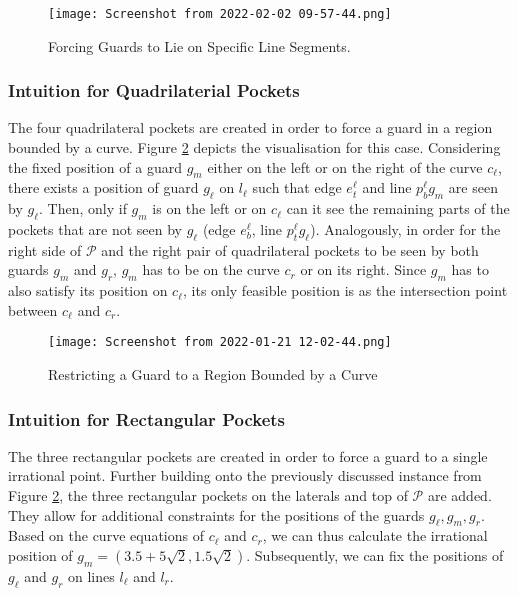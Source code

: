 \begin{figure}[h!]
    \centering
    \texttt{[image: Screenshot from 2022-02-02 09-57-44.png]}
    \caption{Forcing Guards to Lie on Specific Line Segments.}
    \label{fig:tb}
\end{figure}

\subsubsection{Intuition for Quadrilaterial Pockets}
The four quadrilateral pockets are created in order to force a guard in a region bounded by a curve. Figure \ref{fig:quadrilateral_pockets} depicts the visualisation for this case. Considering the fixed position of a guard $g_m$ either on the left or on the right of the curve $c_\ell$, there exists a position of guard $g_\ell$ on $l_\ell$ such that edge $e_t^\ell$ and line $p_b^{\ell}g_m$ are seen by $g_\ell$. Then, only if $g_m$ is on the left or on $c_\ell$ can it see the remaining parts of the pockets that are not seen by $g_\ell$ (edge $e_b^{\ell}$, line $p_t^{\ell}g_{\ell}$). Analogously, in order for the right side of $\mathcal P$ and the right pair of quadrilateral pockets to be seen by both guards $g_m$ and $g_r$, $g_m$ has to be on the curve $c_r$ or on its right. Since $g_m$ has to also satisfy its position on $c_\ell$, its only feasible position is as the intersection point between $c_\ell$ and $c_r$. 

\begin{figure}[h!]
    \centering
    \texttt{[image: Screenshot from 2022-01-21 12-02-44.png]}
    \caption{Restricting a Guard to a Region Bounded by a Curve}
    \label{fig:quadrilateral_pockets}
\end{figure}

\subsubsection{Intuition for Rectangular Pockets}
The three rectangular pockets are created in order to force a guard to a single irrational point. Further building onto the previously discussed instance from Figure \ref{fig:quadrilateral_pockets}, the three rectangular pockets on the laterals and top of $\mathcal P$ are added.  They allow for additional constraints for the positions of the guards $g_\ell, g_m, g_r$. Based on the curve equations of $c_\ell$ and $c_r$, we can thus calculate the irrational position of $g_m = (3.5 + 5\sqrt 2, 1.5\sqrt 2)$. Subsequently, we can fix the positions of $g_\ell$ and $g_r$ on lines $l_\ell$ and $l_r$.

